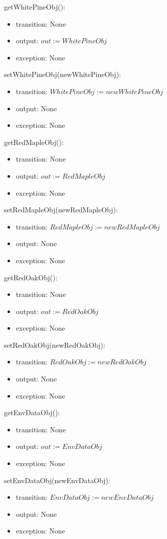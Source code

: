 \documentclass[12pt, titlepage]{article}
\begin{document}
\renewcommand{\attr}{WhitePineObj}
\noindent get\attr():
\begin{itemize}
\item transition: None
\item output: $\mathit{out := \attr}$
\item exception: None
\end{itemize}
\noindent set\attr(new\attr):
\begin{itemize}
\item transition: $\mathit{\attr := new\attr}$
\item output: None
\item exception: None
\end{itemize}
\renewcommand{\attr}{RedMapleObj}
\noindent get\attr():
\begin{itemize}
\item transition: None
\item output: $\mathit{out := \attr}$
\item exception: None
\end{itemize}
\noindent set\attr(new\attr):
\begin{itemize}
\item transition: $\mathit{\attr := new\attr}$
\item output: None
\item exception: None
\end{itemize}
\renewcommand{\attr}{RedOakObj}
\noindent get\attr():
\begin{itemize}
\item transition: None
\item output: $\mathit{out := \attr}$
\item exception: None
\end{itemize}
\noindent set\attr(new\attr):
\begin{itemize}
\item transition: $\mathit{\attr := new\attr}$
\item output: None
\item exception: None
\end{itemize}
\renewcommand{\attr}{EnvDataObj}
\noindent get\attr():
\begin{itemize}
\item transition: None
\item output: $\mathit{out := \attr}$
\item exception: None
\end{itemize}
\noindent set\attr(new\attr):
\begin{itemize}
\item transition: $\mathit{\attr := new\attr}$
\item output: None
\item exception: None
\end{itemize}
\end{document}
